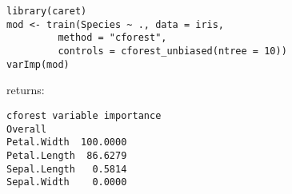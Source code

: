 \documentclass[caret-main.tex]{subfiles}
\begin{document}
%
\begin{verbatim}
library(caret)
mod <- train(Species ~ ., data = iris,
         method = "cforest",
         controls = cforest_unbiased(ntree = 10))
varImp(mod)
\end{verbatim}
returns:
\begin{verbatim}
cforest variable importance
Overall
Petal.Width  100.0000
Petal.Length  86.6279
Sepal.Length   0.5814
Sepal.Width    0.0000 
\end{verbatim}
\end{document}
